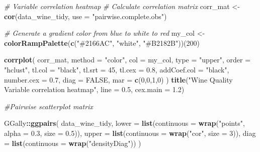 \documentclass[
  doc,floatsintext]{apa6}
\newenvironment{Shaded}{\begin{snugshade}}{\end{snugshade}}
\newcommand{\AttributeTok}[1]{\textcolor[rgb]{0.13,0.29,0.53}{#1}}
\newcommand{\CommentTok}[1]{\textcolor[rgb]{0.56,0.35,0.01}{\textit{#1}}}
\newcommand{\ConstantTok}[1]{\textcolor[rgb]{0.56,0.35,0.01}{#1}}
\newcommand{\DecValTok}[1]{\textcolor[rgb]{0.00,0.00,0.81}{#1}}
\newcommand{\FloatTok}[1]{\textcolor[rgb]{0.00,0.00,0.81}{#1}}
\newcommand{\FunctionTok}[1]{\textcolor[rgb]{0.13,0.29,0.53}{\textbf{#1}}}
\newcommand{\NormalTok}[1]{#1}
\newcommand{\OtherTok}[1]{\textcolor[rgb]{0.56,0.35,0.01}{#1}}
\newcommand{\SpecialCharTok}[1]{\textcolor[rgb]{0.81,0.36,0.00}{\textbf{#1}}}
\newcommand{\StringTok}[1]{\textcolor[rgb]{0.31,0.60,0.02}{#1}}
\begin{document}
\begin{Shaded}
\begin{Highlighting}[]
\CommentTok{\# Variable correlation heatmap}
\CommentTok{\# Calculate correlation matrix}
\NormalTok{corr\_mat }\OtherTok{\textless{}{-}} \FunctionTok{cor}\NormalTok{(data\_wine\_tidy, }\AttributeTok{use =} \StringTok{"pairwise.complete.obs"}\NormalTok{)}

\CommentTok{\# Generate a gradient color from blue to white to red}
\NormalTok{my\_col }\OtherTok{\textless{}{-}} \FunctionTok{colorRampPalette}\NormalTok{(}\FunctionTok{c}\NormalTok{(}\StringTok{"\#2166AC"}\NormalTok{, }\StringTok{"white"}\NormalTok{, }\StringTok{"\#B2182B"}\NormalTok{))(}\DecValTok{200}\NormalTok{)}

\FunctionTok{corrplot}\NormalTok{(}
\NormalTok{  corr\_mat,}
  \AttributeTok{method      =} \StringTok{"color"}\NormalTok{,}
  \AttributeTok{col         =}\NormalTok{ my\_col,}
  \AttributeTok{type        =} \StringTok{"upper"}\NormalTok{,}
  \AttributeTok{order       =} \StringTok{"hclust"}\NormalTok{,}
  \AttributeTok{tl.col      =} \StringTok{"black"}\NormalTok{, }
  \AttributeTok{tl.srt      =} \DecValTok{45}\NormalTok{,}
  \AttributeTok{tl.cex      =} \FloatTok{0.8}\NormalTok{,}
  \AttributeTok{addCoef.col =} \StringTok{"black"}\NormalTok{,}
  \AttributeTok{number.cex  =} \FloatTok{0.7}\NormalTok{,}
  \AttributeTok{diag        =} \ConstantTok{FALSE}\NormalTok{,}
  \AttributeTok{mar         =} \FunctionTok{c}\NormalTok{(}\DecValTok{0}\NormalTok{,}\DecValTok{0}\NormalTok{,}\DecValTok{1}\NormalTok{,}\DecValTok{0}\NormalTok{)}
\NormalTok{)}
\FunctionTok{title}\NormalTok{(}\StringTok{"Wine Quality Variable correlation heatmap"}\NormalTok{, }\AttributeTok{line =} \FloatTok{0.5}\NormalTok{, }\AttributeTok{cex.main =} \FloatTok{1.2}\NormalTok{)}


\CommentTok{\#Pairwise scatterplot matrix}

\NormalTok{GGally}\SpecialCharTok{::}\FunctionTok{ggpairs}\NormalTok{(}
\NormalTok{  data\_wine\_tidy,}
  \AttributeTok{lower =} \FunctionTok{list}\NormalTok{(}\AttributeTok{continuous =} \FunctionTok{wrap}\NormalTok{(}\StringTok{"points"}\NormalTok{, }\AttributeTok{alpha =} \FloatTok{0.3}\NormalTok{, }\AttributeTok{size =} \FloatTok{0.5}\NormalTok{)),}
  \AttributeTok{upper =} \FunctionTok{list}\NormalTok{(}\AttributeTok{continuous =} \FunctionTok{wrap}\NormalTok{(}\StringTok{"cor"}\NormalTok{, }\AttributeTok{size =} \DecValTok{3}\NormalTok{)),}
  \AttributeTok{diag  =} \FunctionTok{list}\NormalTok{(}\AttributeTok{continuous =} \FunctionTok{wrap}\NormalTok{(}\StringTok{"densityDiag"}\NormalTok{))}
\NormalTok{)}


\end{Highlighting}
\end{Shaded}
\end{document}
